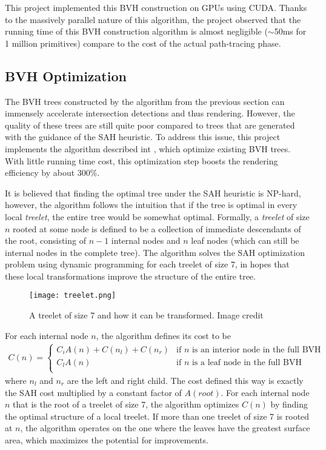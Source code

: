 
This project implemented this BVH construction on GPUs using CUDA. Thanks to the massively parallel nature of this algorithm, the project observed that the running time of this BVH construction algorithm is almost negligible ($\sim$50ms for 1 million primitives) compare to the cost of the actual path-tracing phase.


\subsection{BVH Optimization}
The BVH trees constructed by the algorithm from the previous section can immensely accelerate intersection detections and thus rendering. However, the quality of these trees are still quite poor compared to trees that are generated with the guidance of the SAH heuristic. To address this issue, this project implements the algorithm described int \cite{bvh_optimize}, which optimize existing BVH trees. With little running time cost, this optimization step boosts the rendering efficiency by about $300\%$.

It is believed that finding the optimal tree under the SAH heuristic is NP-hard\cite{bvh_optimize}, however, the algorithm follows the intuition that if the tree is optimal in every local \textit{treelet}, the entire tree would be somewhat optimal. Formally, a \textit{treelet} of size $n$ rooted at some node is defined to be a collection of immediate descendants of the root, consisting of $n-1$ internal nodes and $n$ leaf nodes (which can still be internal nodes in the complete tree). The algorithm solves the SAH optimization problem using dynamic programming for each treelet of size 7, in hopes that these local transformations improve the structure of the entire tree. 

\begin{figure}[H]
    \centering
    \texttt{[image: treelet.png]}
    \caption{A treelet of size 7 and how it can be transformed. Image credit \cite{bvh_optimize}}
\end{figure}
For each internal node $n$, the algorithm defines its cost to be 
\begin{align*}
    C(n) = 
    \begin{cases}
        C_i A(n) + C(n_l) + C(n_r) &\text{if $n$ is an interior node in the full BVH}\\
        C_l A(n) &\text{if $n$ is a leaf node in the full BVH}\\
    \end{cases}
\end{align*}
where $n_l$ and $n_r$ are the left and right child. The cost defined this way is exactly the SAH cost multiplied by a constant factor of $A(root)$. For each internal node $n$ that is the root of a treelet of size 7, the algorithm optimizes $C(n)$ by finding the optimal structure of a local treelet. If more than one treelet of size 7 is rooted at $n$, the algorithm operates on the one where the leaves have the greatest surface area, which maximizes the potential for improvements. 

